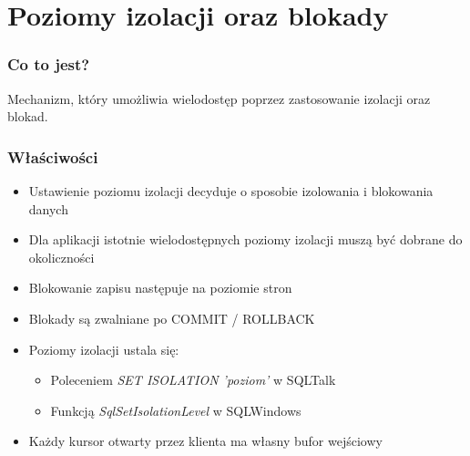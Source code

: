 \documentclass[a4paper,twoside]{article}
\begin{document}
  	\part*{Poziomy izolacji oraz blokady}
  	
  	
  	\section*{Co to jest?}
  	Mechanizm, który umożliwia wielodostęp poprzez zastosowanie izolacji oraz blokad.
  	
  	\section*{Właściwości}
  	\begin{itemize}
  		\item Ustawienie poziomu izolacji decyduje o sposobie izolowania i blokowania danych 
  		\item Dla aplikacji istotnie wielodostępnych poziomy izolacji muszą być dobrane do okoliczności 
  		\item Blokowanie zapisu następuje na poziomie stron 
  		\item Blokady są zwalniane po COMMIT / ROLLBACK 
  		\item Poziomy izolacji ustala się:
  		\begin{itemize}
  			\item Poleceniem \emph{SET ISOLATION 'poziom'} w SQLTalk 
  			\item Funkcją \emph{SqlSetIsolationLevel} w SQLWindows
  		\end{itemize}
  		\item Każdy kursor otwarty przez klienta ma własny bufor wejściowy
  	\end{itemize}
  	
\end{document}
